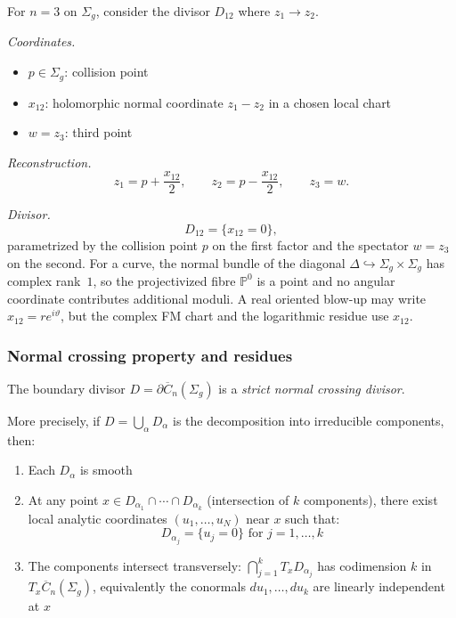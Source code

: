 \begin{example}\label{ex:three-points-coords}
For $n=3$ on $\Sigma_g$, consider the divisor $D_{12}$ where $z_1 \to z_2$.

\emph{Coordinates.}
\begin{itemize}
\item $p \in \Sigma_g$: collision point
\item $x_{12}$: holomorphic normal coordinate $z_1-z_2$ in a chosen
local chart
\item $w = z_3$: third point
\end{itemize}

\emph{Reconstruction.}
\[
z_1=p+\frac{x_{12}}2,\qquad
z_2=p-\frac{x_{12}}2,\qquad z_3=w.
\]

\emph{Divisor.}
\[
D_{12} = \{x_{12}=0\},
\]
parametrized by the collision point $p$ on the first factor and the
spectator $w = z_3$ on the second. For a curve, the normal bundle of
the diagonal $\Delta \hookrightarrow \Sigma_g \times \Sigma_g$ has
complex rank~$1$, so the projectivized fibre $\mathbb{P}^0$ is a point
and no angular coordinate contributes additional moduli. A real
oriented blow-up may write $x_{12}=re^{i\vartheta}$, but the complex
FM chart and the logarithmic residue use $x_{12}$.
\end{example}

\subsubsection{Normal crossing property and residues}

\begin{theorem}\label{thm:normal-crossings}
The boundary divisor $D = \partial\overline{C}_n(\Sigma_g)$ is a \emph{strict normal crossing divisor}.

More precisely, if $D = \bigcup_{\alpha} D_\alpha$ is the decomposition into irreducible components, then:
\begin{enumerate}
\item Each $D_\alpha$ is smooth
\item At any point $x \in D_{\alpha_1} \cap \cdots \cap D_{\alpha_k}$ (intersection of $k$ components), there exist local analytic coordinates $(u_1, \ldots, u_N)$ near $x$ such that:
\[D_{\alpha_j} = \{u_j = 0\} \text{ for } j = 1,\ldots,k\]
\item The components intersect transversely: $\bigcap_{j=1}^k T_x D_{\alpha_j}$ has codimension $k$ in $T_x \overline{C}_n(\Sigma_g)$, equivalently the conormals $du_1, \ldots, du_k$ are linearly independent at $x$
\end{enumerate}
\end{theorem}

